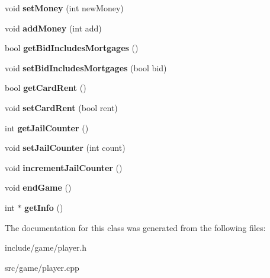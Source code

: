 \begin{DoxyCompactItemize}
\item 
\hypertarget{classPlayer_a93fdf9805d66abf2f65e00e04eb2952a}{void {\bfseries set\-Money} (int new\-Money)}\label{classPlayer_a93fdf9805d66abf2f65e00e04eb2952a}

\item 
\hypertarget{classPlayer_ac34b6390b5fcb63e25e0d6d4a096a89d}{void {\bfseries add\-Money} (int add)}\label{classPlayer_ac34b6390b5fcb63e25e0d6d4a096a89d}

\item 
\hypertarget{classPlayer_afad0da26d74749fc8ff17c14c818b4c1}{bool {\bfseries get\-Bid\-Includes\-Mortgages} ()}\label{classPlayer_afad0da26d74749fc8ff17c14c818b4c1}

\item 
\hypertarget{classPlayer_a0eb77494be92dc51e65fa24d1cbfb136}{void {\bfseries set\-Bid\-Includes\-Mortgages} (bool bid)}\label{classPlayer_a0eb77494be92dc51e65fa24d1cbfb136}

\item 
\hypertarget{classPlayer_a3274e1ed43d82193a78e7f77679a2adf}{bool {\bfseries get\-Card\-Rent} ()}\label{classPlayer_a3274e1ed43d82193a78e7f77679a2adf}

\item 
\hypertarget{classPlayer_acba645891b81b84fa901dc02245d5c53}{void {\bfseries set\-Card\-Rent} (bool rent)}\label{classPlayer_acba645891b81b84fa901dc02245d5c53}

\item 
\hypertarget{classPlayer_a975a7180745834ff6dfbdc1243947cce}{int {\bfseries get\-Jail\-Counter} ()}\label{classPlayer_a975a7180745834ff6dfbdc1243947cce}

\item 
\hypertarget{classPlayer_a6b3636df75ecaf0912a4ea40c3a38849}{void {\bfseries set\-Jail\-Counter} (int count)}\label{classPlayer_a6b3636df75ecaf0912a4ea40c3a38849}

\item 
\hypertarget{classPlayer_a41f3620bf743eabb1a62ed9313cd5c12}{void {\bfseries increment\-Jail\-Counter} ()}\label{classPlayer_a41f3620bf743eabb1a62ed9313cd5c12}

\item 
\hypertarget{classPlayer_a5a393da4291d86177f88288e66473b98}{void {\bfseries end\-Game} ()}\label{classPlayer_a5a393da4291d86177f88288e66473b98}

\item 
\hypertarget{classPlayer_a5ede74bb5be938fa586247d901a07727}{int $\ast$ {\bfseries get\-Info} ()}\label{classPlayer_a5ede74bb5be938fa586247d901a07727}

\end{DoxyCompactItemize}


The documentation for this class was generated from the following files\-:\begin{DoxyCompactItemize}
\item 
include/game/player.\-h\item 
src/game/player.\-cpp\end{DoxyCompactItemize}

